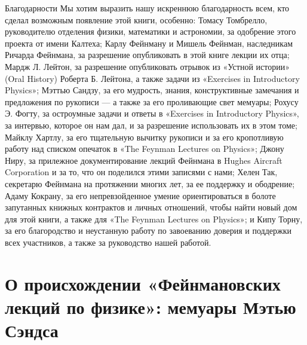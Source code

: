 \documentclass[11pt,oneside]{article}
\begin{document}


\label{tips-sec-4-благодарности}


Благодарности Мы хотим выразить нашу искреннюю благодарность всем, кто сделал возможным появление этой книги, особенно: Томасу Томбрелло, руководителю отделения физики, математики и астрономии, за одобрение этого проекта от имени Калтеха; Карлу Фейнману и Мишель Фейнман, наследникам Ричарда Фейнмана, за разрешение опубликовать в этой книге лекции их отца; Мардж Л. Лейтон, за разрешение опубликовать отрывок из «Устной истории» (Oral History) Роберта Б. Лейтона, а также задачи из «Exercises in Introductory Physics»; Мэттью Сандзу, за его мудрость, знания, конструктивные замечания и предложения по рукописи --- а также за его проливающие свет мемуары; Рохусу Э. Фогту, за остроумные задачи и ответы в «Exercises in Introductory Physics», за интервью, которое он нам дал, и за разрешение использовать их в этом томе; Майклу Хартлу, за его тщательную вычитку рукописи и за его кропотливую работу над списком опечаток в «The Feynman Lectures on Physics»; Джону Ниру, за прилежное документирование лекций Фейнмана в Hughes Aircraft Corporation и за то, что он поделился этими записями с нами; Хелен Так, секретарю Фейнмана на протяжении многих лет, за ее поддержку и ободрение; Адаму Кокрану, за его непревзойденное умение ориентироваться в болоте запутанных книжных контрактов и личных отношений, чтобы найти новый дом для этой книги, а также для «The Feynman Lectures on Physics»; и Кипу Торну, за его благородство и неустанную работу по завоеванию доверия и поддержки всех участников, а также за руководство нашей работой.\par



\clearpage


\section*{О происхождении «Фейнмановских лекций по физике»: мемуары Мэтью Сэндса}


\end{document}
